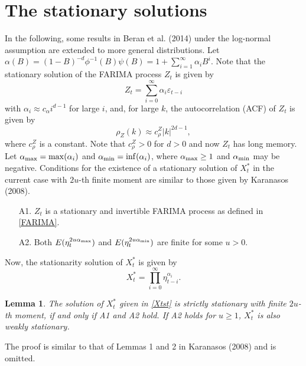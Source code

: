 \documentclass[12pt]{article}
\newtheorem{lemma}{Lemma}
\begin{document}

\section{The stationary solutions}

In the following, some results in Beran et al. (2014) under the log-normal assumption are extended to more general distributions.
Let $\alpha(B)=(1-B)^{-d}\phi^{-1}(B)\psi(B)=1+\sum_{i=1}^\infty\alpha_iB^i$.
Note that the stationary solution of the FARIMA process $Z_t$ is given by
\begin{equation}
Z_t=\sum_{i=0}^\infty \alpha_i\varepsilon_{t-i}
\label{S-Y}
\end{equation}
with $\alpha_i\approx c_\alpha i^{d-1}$ for large $i$, and, for large $k$, the autocorrelation (ACF) of $Z_t$ is given by
\begin{equation}
\rho_{Z}(k) \approx c_{\rho}^Z|k|^{2d-1},
\label{acf of Z}
\end{equation}
where $c_{\rho}^Z$ is a constant. Note that $c_{\rho}^Z>0$ for $d>0$ and now $Z_t$ has long memory.
Let $\alpha_{\rm max}=\max(\alpha_i)$ and $\alpha_{\rm min}=\inf(\alpha_i)$, where $\alpha_{\rm max}\ge 1$ and $\alpha_{\rm min}$ may be negative. Conditions for the existence of a stationary solution of $X_t^*$ in the current case with $2u$-th finite moment are similar to those given by Karanasos (2008).
\begin{enumerate}
\item[A1.] $Z_t$ is a stationary and invertible FARIMA process as defined in \eqref{FARIMA}.
\item[A2.] Both $E(\eta_t^{2u\alpha_{\rm max}})$ and $E(\eta_t^{2u\alpha_{\rm min}})$ are finite for some $u>0$.
\end{enumerate}
Now, the stationarity solution of $X_t^*$ is given by
\begin{equation}
X_t^*=\prod\limits_{i=0}^\infty \eta_{t-i}^{\alpha_i}.
\label{Xtst}
\end{equation}
\begin{lemma}
The solution of $X_t^*$ given in \eqref{Xtst} is strictly stationary with finite $2u$-th moment, if and only if A1 and A2 hold. If A2 holds for $u\ge 1$, $X_t^*$ is also weakly stationary.
\end{lemma}
The proof is similar to that of Lemmas 1 and 2 in Karanasos (2008) and is omitted.
\end{document}
